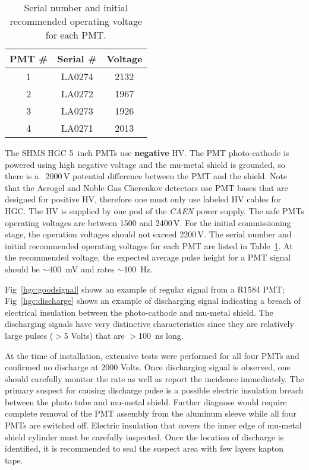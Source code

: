 {%

\begin{table}[t]
\centering
  \begin{tabular}{ |c | c | c |}
    \hline
    PMT \#    & Serial \# & Voltage \\ \hline
    1         & LA0274    & 2132    \\ \hline
    2         & LA0272    & 1967    \\ \hline
    3         & LA0273    & 1926    \\ \hline
    4         & LA0271    & 2013    \\
    \hline
  \end{tabular}
  \caption{Serial number and initial recommended operating voltage for each PMT.} 
  \label{tab:hgc_volt}
\end{table}

The SHMS HGC 5~inch PMTs use {\bf negative} HV. The PMT photo-cathode
is powered using high negative voltage and the mu-metal shield
is grounded, so there is a ~2000\,V potential difference between the PMT
and the shield. Note that the Aerogel and Noble Gas Cherenkov
detectors use PMT bases that are designed for positive HV, therefore
one must only use labeled HV cables for HGC. The HV is supplied by
one pod of the {\em CAEN} power supply. The safe PMTs operating
voltages are between 1500 and 2400\,V. For the initial
commissioning stage, the operation voltages should not exceed 2200\,V.
The serial number and initial recommended operating voltages
for each PMT are listed in Table~\ref{tab:hgc_volt}. At the
recommended voltage, the expected average pulse height for a PMT
signal should be $\sim$400~mV and rates $\sim$100~Hz.


Fig~\ref{hgc:goodsignal} shows an example of regular signal from a
R1584 PMT; Fig~\ref{hgc:discharge} shows an example of discharging
signal indicating a breach of electrical insulation between the
photo-cathode and mu-metal shield. The discharging signals have very
distinctive characteristics since they are relatively large pulses
($>$5 Volts) that are $>$100~ns long.

At the time of installation, extensive tests were performed for all
four PMTs and confirmed no discharge at 2000 Volts. Once discharging
signal is observed, one should carefully monitor the rate as well as
report the incidence immediately. The primary suspect for causing
discharge pulse is a possible electric insulation breach between the
photo tube and mu-metal shield. Further diagnose would require
complete removal of the PMT assembly from the aluminum sleeve while
all four PMTs are switched off. Electric insulation that covers the
inner edge of mu-metal shield cylinder must be carefully
inspected. Once the location of discharge is identified, it is
recommended to seal the suspect area with few layers kapton tape.


}
